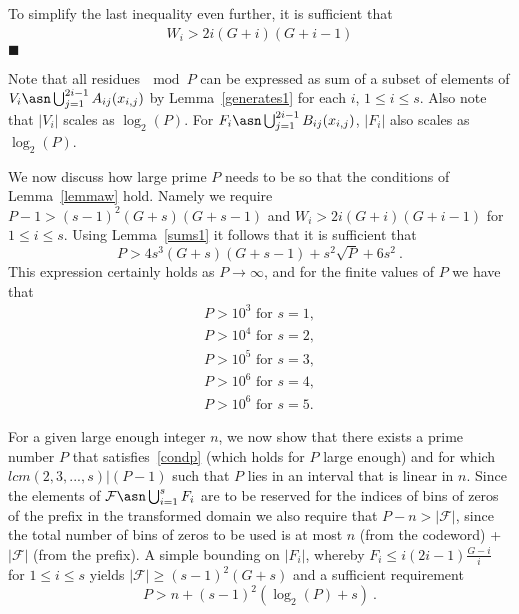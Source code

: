 To simplify the last inequality even further, it is sufficient
that
\begin{equation}\begin{array}{lll} W_i>
2i(G+i)(G+i-1)
\end{array}\end{equation}
 \hfill$\blacksquare$

Note that all residues$~\mod P$ can be expressed as sum of a
subset of elements of $V_i \asn
\bigcup_{j=1}^{2i-1}A_{ij}(x_{i,j})$ by Lemma~\ref{generates1} for
each $i$, $1\leq i \leq s$. Also note that $|V_i|$ scales as
$\log_2(P)$. For $F_i \asn \bigcup_{j=1}^{2i-1}B_{ij}(x_{i,j})$,
 $|F_i|$ also scales as
$\log_2(P)$.

We now discuss how large prime $P$ needs to be so that the
conditions of Lemma~\ref{lemmaw} hold. Namely we require $P-1>
(s-1)^2(G+s)(G+s-1)$ and $W_i>2i(G+i)(G+i-1)$ for $1 \leq i \leq
s$. Using Lemma~\ref{sums1} it follows that it is sufficient that
\begin{equation}\label{condp}
P > 4s^3(G+s)(G+s-1)+s^2\sqrt{P}+6s^2~.
\end{equation}
This expression certainly holds as $P\rightarrow \infty$, and for
the finite values of $P$ we have that
\begin{eqnarray*}
P>10^3 \text{ for } s=1, \\P>10^4 \text{ for } s=2, \\P>10^5
\text{ for } s=3,\\ P>10^6 \text{ for } s=4,\\P>10^6 \text{ for }
s=5.
\end{eqnarray*}

 For a given large enough integer $n$, we now show that
there exists a prime number $P$ that satisfies~\eqref{condp}
(which holds for $P$ large enough) and for which $lcm(2,3,...,s) |
(P-1)$ such that $P$ lies in an interval that is linear in $n$.
Since the elements of $\mathcal{F} \asn \bigcup_{i=1}^s F_i$ are
to be reserved for the indices of bins of zeros of the prefix in
the transformed domain we also require that $P-n > |\mathcal{F}|$,
since the total number of bins of zeros to be used is at most $n$
(from the codeword) + $|\mathcal{F}|$ (from the prefix). A simple
bounding on $|F_i|$, whereby $F_i \leq i(2i-1)\frac{G-i}{i}$ for
$1 \leq i \leq s$ yields $|\mathcal{F}| \geq (s-1)^2(G+s) $ and a
sufficient requirement
\begin{equation}\label{condpn}P>n+(s-1)^2(\log_2(P)+s)~.
\end{equation}

